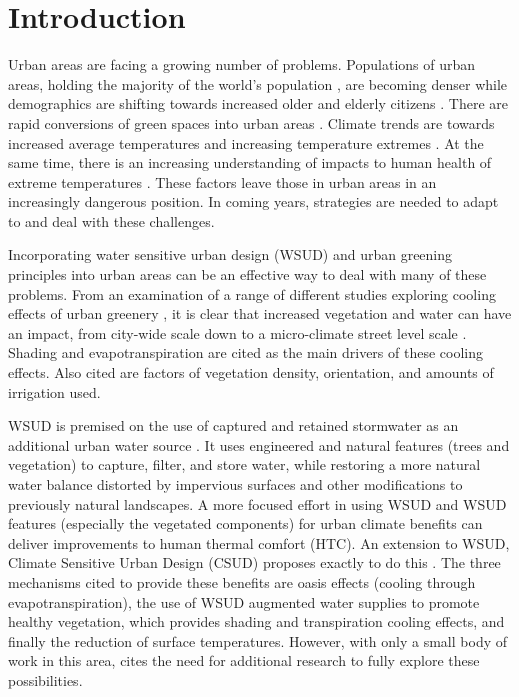 \documentclass[preprint,12pt,authoryear]{elsarticle}
\begin{document}
\section{Introduction}\label{sec:introduction}
Urban areas are facing a growing number of problems. Populations of urban areas, holding the majority of the world's population \citep{UNDESA2015,WHO2016}, are becoming denser while demographics are shifting towards increased older and elderly citizens \citep{ABS2008}. There are rapid conversions of green spaces into urban areas \citep{DSE2002,Coutts2007}. Climate trends are towards increased average temperatures and increasing temperature extremes \citep{Alexander2009,IPCC2013a}. At the same time, there is an increasing understanding of impacts to human health of extreme temperatures \citep{Katsouyanni1993,Nicholls2008,Loughnan2010}. These factors leave those in urban areas in an increasingly dangerous position. In coming years, strategies are needed to adapt to and deal with these challenges.

Incorporating water sensitive urban design (WSUD) and urban greening principles into urban areas can be an effective way to deal with many of these problems. From an examination of a range of different studies exploring cooling effects of urban greenery \citep{Tsiros2010,Shashua-Bar2000,Shashua-Bar2010a,Spangenberg2008}, it is clear that increased vegetation and water can have an impact, from city-wide scale down to a micro-climate street level scale \citep{Coutts2012}. Shading and evapotranspiration are cited \citep{Bowler2010} as the main drivers of these cooling effects. Also cited are factors of vegetation density, orientation, and amounts of irrigation used. 

WSUD is premised on the use of captured and retained stormwater as an additional urban water source \citep{Wong2009}. It uses engineered and natural features (trees and vegetation) to capture, filter, and store water, while restoring a more natural water balance distorted by impervious surfaces and other modifications to previously natural landscapes. A more focused effort in using WSUD and WSUD features (especially the vegetated components) for urban climate benefits can deliver improvements to human thermal comfort (HTC). An extension to WSUD, Climate Sensitive Urban Design (CSUD) proposes exactly to do this \citep{Coutts2012}. The three mechanisms cited to provide these benefits are oasis effects (cooling through evapotranspiration), the use of WSUD augmented water supplies to promote healthy vegetation, which provides shading and transpiration cooling effects, and finally the reduction of surface temperatures. However, with only a small body of work in this area, \cite{Coutts2012} cites the need for additional research to fully explore these possibilities. 
\end{document}
